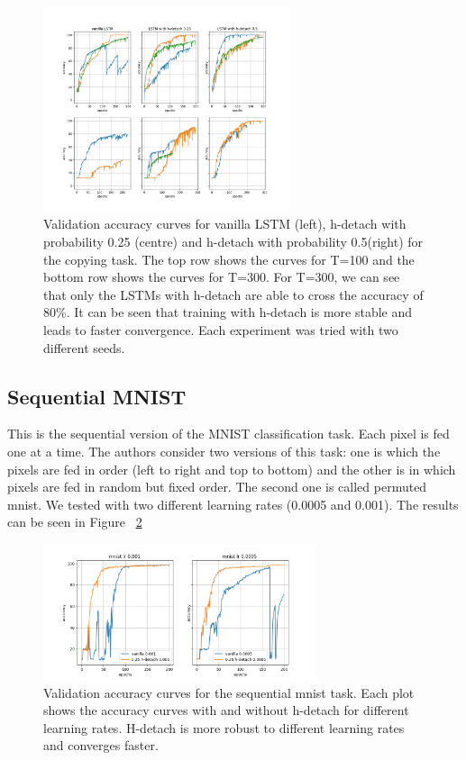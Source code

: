 \begin{figure}[ht]
\begin{center}
  \includegraphics[width=\linewidth,height=6cm]{figures/h_detach_new.png}
\end{center}
\caption{Validation accuracy curves for vanilla LSTM (left), h-detach with probability 0.25 (centre) and h-detach with probability 0.5(right) for the copying task. The top row shows the curves for T=100 and the bottom row shows the curves for T=300. For T=300, we can see that only the LSTMs with h-detach are able to cross the accuracy of 80\%. It can be seen that training with h-detach is more stable and leads to faster convergence. Each experiment was tried with two different seeds.}
\label{fig1:figure1}
\end{figure}


\subsection{Sequential MNIST}
This is the sequential version of the MNIST classification task. Each pixel is fed one at a time. The authors consider two versions of this task: one is which the pixels are fed in order (left to right and top to bottom) and the other is in which pixels are fed in random but fixed order. The second one is called permuted mnist. We tested with two different learning rates (0.0005 and 0.001). The results can be seen in Figure ~\ref{figure2}

\begin{figure}[ht]
\begin{center}
 \includegraphics[width=\linewidth, height = 4cm]{figures/mnist.png}
\end{center}
\caption{Validation accuracy curves for the sequential mnist task. Each plot shows the accuracy curves with and without h-detach for different learning rates. H-detach is more robust to different learning rates and converges faster.}
\label{figure2}
\end{figure}

